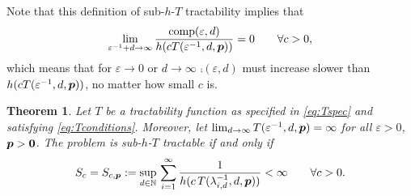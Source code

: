 \documentclass[sort&compress]{elsarticle}
\newtheorem{theorem}{Theorem}
\begin{document}
Note that this definition of sub-$h$-$T$ tractability implies that
\begin{equation} \label{eq:comp_slow_hcT}
		\lim_{\varepsilon^{-1} + d \to \infty} \frac{\operatorname{comp}(\varepsilon,d)}{h(cT(\varepsilon^{-1},d,\boldsymbol{p}))} = 0 \qquad \forall c > 0,
\end{equation}
which means that for $\varepsilon \to 0$ or $d \to \infty$  $\comp(\varepsilon,d)$ must increase slower than $h(cT(\varepsilon^{-1},d,\boldsymbol{p}))$, no matter how small $c$ is.

\begin{theorem}\label{thm:subhT}
	Let $T$ be a tractability function as specified in \eqref{eq:Tspec} and satisfying \eqref{eq:Tconditions}.  Moreover, let $\lim_{d \to \infty} T(\varepsilon^{-1},d,\boldsymbol{p}) = \infty$ for all $\varepsilon > 0$, $\boldsymbol{p} > \boldsymbol{0}$.  The problem is sub-$h$-$T$ tractable if and only if
	\[
	S_c = S_{c,\boldsymbol{p}} :=\sup_{d\in\mathbb{N}}  \, \sum_{i=1}^\infty \frac1{h(c\, T(\lambda_{i,d}^{-1},d,\boldsymbol{p}))} <\infty \qquad \forall c > 0.
	\]
\end{theorem}
\end{document}
